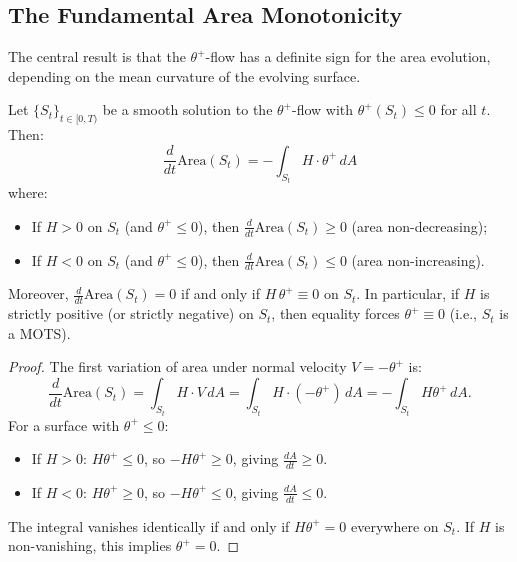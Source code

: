 \subsection{The Fundamental Area Monotonicity}
\label{subsec:area-monotonicity}

The central result is that the $\theta^+$-flow has a definite sign for the area evolution, depending on the mean curvature of the evolving surface.

\begin{theorem}
\label{thm:area-monotonicity}
Let $\{S_t\}_{t \in [0,T)}$ be a smooth solution to the $\theta^+$-flow with $\theta^+(S_t) \leq 0$ for all $t$. Then:
\begin{equation}
\frac{d}{dt}\mathrm{Area}(S_t) = -\int_{S_t} H \cdot \theta^+ \, dA
\label{eq:area-monotone}
\end{equation}
where:
\begin{itemize}
\item If $H > 0$ on $S_t$ (and $\theta^+ \leq 0$), then $\frac{d}{dt}\mathrm{Area}(S_t) \geq 0$ (area non-decreasing);
\item If $H < 0$ on $S_t$ (and $\theta^+ \leq 0$), then $\frac{d}{dt}\mathrm{Area}(S_t) \leq 0$ (area non-increasing).
\end{itemize}
Moreover, $\frac{d}{dt}\mathrm{Area}(S_t)=0$ if and only if $H\,\theta^+ \equiv 0$ on $S_t$.
In particular, if $H$ is strictly positive (or strictly negative) on $S_t$, then equality forces $\theta^+\equiv 0$ (i.e., $S_t$ is a MOTS).
\end{theorem}

\begin{proof}
The first variation of area under normal velocity $V = -\theta^+$ is:
\begin{equation}
\frac{d}{dt}\mathrm{Area}(S_t) = \int_{S_t} H \cdot V \, dA = \int_{S_t} H \cdot (-\theta^+) \, dA = -\int_{S_t} H\theta^+ \, dA.
\end{equation}
For a surface with $\theta^+ \leq 0$:
\begin{itemize}
\item If $H > 0$: $H\theta^+ \leq 0$, so $-H\theta^+ \geq 0$, giving $\frac{dA}{dt} \geq 0$.
\item If $H < 0$: $H\theta^+ \geq 0$, so $-H\theta^+ \leq 0$, giving $\frac{dA}{dt} \leq 0$.
\end{itemize}
The integral vanishes identically if and only if $H\theta^+ = 0$ everywhere on $S_t$. If $H$ is non-vanishing, this implies $\theta^+ = 0$.
\end{proof}

